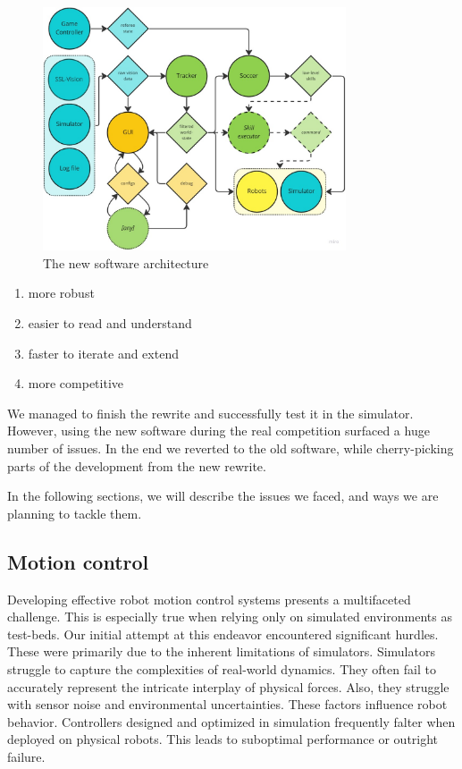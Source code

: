 \documentclass[runningheads]{llncs}
\begin{document}
\begin{figure}
    \centering
    \includegraphics[width=0.8\textwidth]{images/software-architecture.jpg}
    \caption{The new software architecture}
    \label{fig:software-architecture}
\end{figure}

\begin{enumerate}
    \item more robust
    \item easier to read and understand
    \item faster to iterate and extend
    \item more competitive
\end{enumerate}

We managed to finish the rewrite and successfully test it in the simulator. However, using the new software during the real competition surfaced a huge number of issues. In the end we reverted to the old software, while cherry-picking parts of the development from the new rewrite.

In the following sections, we will describe the issues we faced, and ways we are planning to tackle them.

\subsection{Motion control}
Developing effective robot motion control systems presents a multifaceted challenge. This is especially true when relying only on simulated environments as test-beds. Our initial attempt at this endeavor encountered significant hurdles. These were primarily due to the inherent limitations of simulators. Simulators struggle to capture the complexities of real-world dynamics. They often fail to accurately represent the intricate interplay of physical forces. Also, they struggle with sensor noise and environmental uncertainties. These factors influence robot behavior. Controllers designed and optimized in simulation frequently falter when deployed on physical robots. This leads to suboptimal performance or outright failure.
\end{document}
